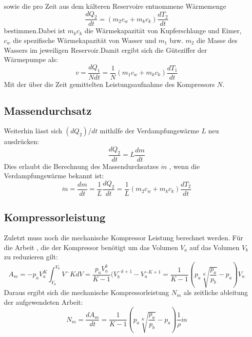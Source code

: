 sowie die pro Zeit aus dem kälteren Reservoire entnommene Wärmemenge
\begin{equation}
\frac{dQ_2}{dt}=(m_2c_w+m_kc_k)\frac{dT_2}{dt}
\end{equation}
bestimmen.Dabei ist $m_k c_k$ die Wärmekapazität von Kupferschlange und Eimer, $c_w$ die spezifische Wärmekapazität von Wasser und $m_1$ bzw. $m_2$ die Masse des Wassers im jeweiligen Reservoir.Damit ergibt sich die Güteziffer der Wärmepumpe als:
\begin{equation}
v=\frac{dQ_1}{Ndt}=\frac{1}{N}(m_1c_w+m_kc_k)\frac{dT_1}{dt}
\end{equation}
Mit der über die Zeit gemittelten Leistungsaufnahme des Kompressors $N$.
\subsection{Massendurchsatz}
Weiterhin lässt sich $(dQ_2)/dt$ mithilfe der Verdampfungswärme $L$ neu ausdrücken:
\begin{equation}
\frac{dQ_2}{dt}=L\frac{dm}{dt}
\end{equation}
Dies erlaubt die Berechnung des Massendurchsatzes $\dot{m}$ , wenn die Verdampfungswärme bekannt ist:
\begin{equation}
\dot{m}=\frac{dm}{dt}=\frac{1}{L}\frac{dQ_2}{dt}=\frac{1}{L}(m_2c_w+m_kc_k)\frac{dT_2}{dt}
\end{equation}
\subsection{Kompressorleistung}
Zuletzt muss noch die mechanische Kompressor Leistung berechnet werden. Für die Arbeit , die der Kompressor benötigt um das Volumen $V_a$ auf das Volumen $V_b$ zu reduzieren gilt:
\begin{equation}
A_m=-p_aV_a^K\int_{V_a}^{V_b} V^-K dV=\frac{p_aV_a^k}{K-1}(V_b^{-k+1}-V_a^{-K+1}=\frac{1}{K-1}(p_a\sqrt[K]{\frac{p_a}{p_b}}-p_a)V_a
\end{equation}
Daraus ergibt sich die mechanische Kompressorleistung $N_m$ als zeitliche ableitung der aufgewendeten Arbeit:
\begin{equation}
N_m=\frac{dA_m}{dt}=\frac{1}{K-1}(p_a\sqrt[K]{\frac{p_a}{p_b}}-p_a)\frac{1}{\rho}\dot{m}
\end{equation}
